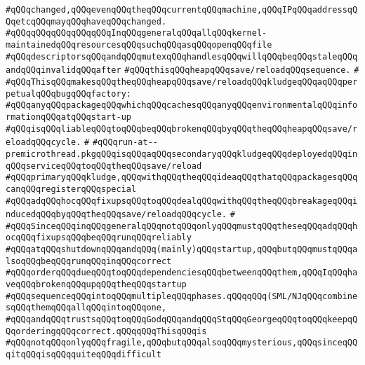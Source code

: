 \verb|#qQQqchanged,qQQqevenqQQqtheqQQqcurrentqQQqmachine,qQQqIPqQQqaddressqQQqetcqQQqmayqQQqhaveqQQqchanged.|\newline
\verb|#qQQqqQQqqQQqqQQqqQQqInqQQqgeneralqQQqallqQQqkernel-maintainedqQQqresourcesqQQqsuchqQQqasqQQqopenqQQqfile|\newline
\verb|#qQQqdescriptorsqQQqandqQQqmutexqQQqhandlesqQQqwillqQQqbeqQQqstaleqQQqandqQQqinvalidqQQqafter|\newline
\verb|#qQQqthisqQQqheapqQQqsave/reloadqQQqsequence.|\newline
\verb|#|\newline
\verb|#qQQqThisqQQqmakesqQQqtheqQQqheapqQQqsave/reloadqQQqkludgeqQQqaqQQqperpetualqQQqbugqQQqfactory:|\newline
\verb|#qQQqanyqQQqpackageqQQqwhichqQQqcachesqQQqanyqQQqenvironmentalqQQqinformationqQQqatqQQqstart-up|\newline
\verb|#qQQqisqQQqliableqQQqtoqQQqbeqQQqbrokenqQQqbyqQQqtheqQQqheapqQQqsave/reloadqQQqcycle.|\newline
\verb|#|\newline
\verb|#qQQqrun-at--premicrothread.pkgqQQqisqQQqaqQQqsecondaryqQQqkludgeqQQqdeployedqQQqinqQQqserviceqQQqtoqQQqtheqQQqsave/reload|\newline
\verb|#qQQqprimaryqQQqkludge,qQQqwithqQQqtheqQQqideaqQQqthatqQQqpackagesqQQqcanqQQqregisterqQQqspecial|\newline
\verb|#qQQqadqQQqhocqQQqfixupsqQQqtoqQQqdealqQQqwithqQQqtheqQQqbreakageqQQqinducedqQQqbyqQQqtheqQQqsave/reloadqQQqcycle.|\newline
\verb|#|\newline
\verb|#qQQqSinceqQQqinqQQqgeneralqQQqnotqQQqonlyqQQqmustqQQqtheseqQQqadqQQqhocqQQqfixupsqQQqbeqQQqrunqQQqreliably|\newline
\verb|#qQQqatqQQqshutdownqQQqandqQQq(mainly)qQQqstartup,qQQqbutqQQqmustqQQqalsoqQQqbeqQQqrunqQQqinqQQqcorrect|\newline
\verb|#qQQqorderqQQqdueqQQqtoqQQqdependenciesqQQqbetweenqQQqthem,qQQqIqQQqhaveqQQqbrokenqQQqupqQQqtheqQQqstartup|\newline
\verb|#qQQqsequenceqQQqintoqQQqmultipleqQQqphases.qQQqqQQq(SML/NJqQQqcombinesqQQqthemqQQqallqQQqintoqQQqone,|\newline
\verb|#qQQqandqQQqtrustsqQQqtoqQQqGodqQQqandqQQqStqQQqGeorgeqQQqtoqQQqkeepqQQqorderingqQQqcorrect.qQQqqQQqThisqQQqis|\newline
\verb|#qQQqnotqQQqonlyqQQqfragile,qQQqbutqQQqalsoqQQqmysterious,qQQqsinceqQQqitqQQqisqQQqquiteqQQqdifficult|\newline
